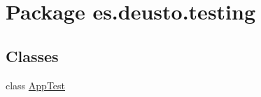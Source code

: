 \hypertarget{namespacees_1_1deusto_1_1testing}{}\section{Package es.\+deusto.\+testing}
\label{namespacees_1_1deusto_1_1testing}
\subsection*{Classes}
\begin{DoxyCompactItemize}
\item 
class \mbox{\hyperlink{classes_1_1deusto_1_1testing_1_1_app_test}{App\+Test}}
\end{DoxyCompactItemize}
